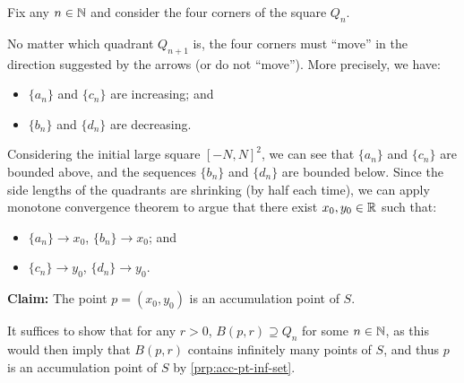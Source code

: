 \begin{enumerate}
\begin{pf}
\begin{pf}
Fix any \(n\in\mathbb{N}\) and consider the four corners of the square \(Q_n\).
\begin{center}
\end{center}
No matter which quadrant \(Q_{n+1}\) is, the four corners must ``move'' in the
direction suggested by the  arrows (or do not ``move''). More
precisely, we have:
\begin{itemize}
\item \(\{a_n\}\) and \(\{c_n\}\) are increasing; and
\item \(\{b_n\}\) and \(\{d_n\}\) are decreasing.
\end{itemize}
Considering the initial large square \([-N,N]^{2}\), we can see that
\(\{a_n\}\) and \(\{c_n\}\) are bounded above, and the sequences \(\{b_n\}\)
and \(\{d_n\}\) are bounded below. Since the side lengths of the quadrants are
shrinking (by half each time), we can apply monotone convergence theorem to
argue that there exist \(x_0,y_0\in\mathbb{R}\) such that: 
\begin{itemize}
\item \(\{a_n\}\to x_0\), \(\{b_n\}\to x_0\); and
\item \(\{c_n\}\to y_0\), \(\{d_n\}\to y_0\).
\end{itemize}
\end{pf}

\textbf{Claim:} The point \(p=(x_0,y_0)\) is an accumulation point of \(S\).

\begin{pf}
It suffices to show that for any \(r>0\), \(B(p,r)\supseteq Q_n\) for some
\(n\in\mathbb{N}\), as this would then imply that \(B(p,r)\) contains infinitely many
points of \(S\), and thus \(p\) is an accumulation point of \(S\) by \cref{prp:acc-pt-inf-set}.


\end{pf}
\end{pf}
\end{enumerate}
